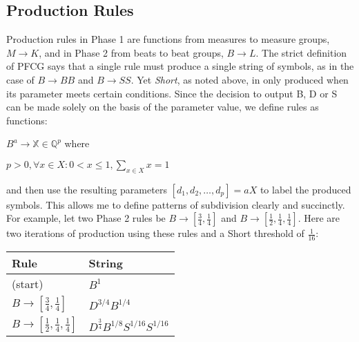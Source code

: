 \documentclass{article}
\begin{document}







\subsection{Production Rules}

Production rules in Phase 1 are functions from measures to measure groups, $M \rightarrow K$, and in Phase 2 from beats to beat groups, $B \rightarrow L$. The strict definition of PFCG says that a single rule must produce a single string of symbols, as in the case of $B \rightarrow BB$ and $B \rightarrow SS$.  Yet \emph{Short}, as noted above, in only produced when its parameter meets certain conditions. Since the decision to output B, D or S can be made solely on the basis of the parameter value, we define rules as functions:

$B^a \rightarrow \mathbb{X} \in \mathbb{Q}^{p}$ where 

$p > 0 , \forall x \in X: 0 < x \leq 1, \sum_{x \in X} x = 1$

and then use the resulting parameters $[d_1,d_2,…,d_p]=aX$ to label the produced symbols. This allows me to define patterns of subdivision clearly and succinctly. For example, let two Phase 2 rules be $B \rightarrow [\frac{3}{4}, \frac{1}{4}]$ and $B \rightarrow [\frac{1}{2}, \frac{1}{4}, \frac{1}{4}]$. Here are two iterations of production using these rules and a Short threshold of $\frac{1}{16}$:

\bgroup
\def\arraystretch{1.5}
\begin{center}
\begin{tabular}{ l l }
 Rule & String \\
 \hline
 (start)                                                  & $B^{1}$ \\
 $B \rightarrow [\frac{3}{4}, \frac{1}{4}]$               & $D^{3/4} B^{1/4}$ \\
 $B \rightarrow [\frac{1}{2}, \frac{1}{4}, \frac{1}{4}]$  & $D^{\frac{3}{4}} B^{1/8} S^{1/16} S^{1/16}$ \\
\end{tabular}
\end{center}
\egroup
\end{document}
